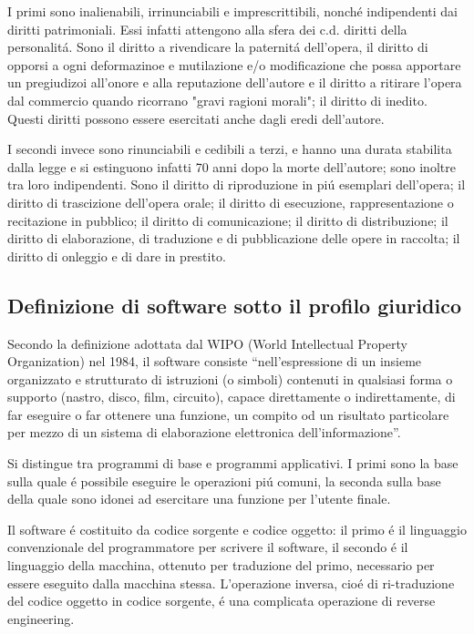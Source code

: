 \documentclass{article}
\begin{document}
I primi sono inalienabili, irrinunciabili e imprescrittibili, nonch\'e indipendenti dai diritti patrimoniali. Essi infatti attengono alla sfera dei c.d. diritti della personalit\'a. Sono il diritto a rivendicare la paternit\'a dell'opera, il diritto di opporsi a ogni deformazinoe e mutilazione e/o modificazione che possa apportare un pregiudizoi all'onore e alla reputazione dell'autore e il diritto a ritirare l'opera dal commercio quando ricorrano "gravi ragioni morali"; il diritto di inedito. Questi diritti possono essere esercitati anche dagli eredi dell'autore.

I secondi invece sono rinunciabili e cedibili a terzi, e hanno una durata stabilita dalla legge e si estinguono infatti 70 anni dopo la morte dell'autore; sono inoltre tra loro indipendenti. Sono il diritto di riproduzione in pi\'u esemplari dell'opera; il diritto di trascizione dell'opera orale; il diritto di esecuzione, rappresentazione o recitazione in pubblico; il diritto di comunicazione; il diritto di distribuzione; il diritto di elaborazione, di traduzione e di pubblicazione delle opere in raccolta; il diritto di onleggio e di dare in prestito.

\subsection{Definizione di software sotto il profilo giuridico}
Secondo la definizione adottata dal WIPO (World Intellectual Property Organization) nel 1984, il software consiste “nell’espressione di un insieme organizzato e strutturato di istruzioni (o simboli) contenuti in qualsiasi forma o supporto (nastro, disco, film, circuito), capace direttamente o indirettamente, di far eseguire o far ottenere una funzione, un compito od un risultato particolare per mezzo di un sistema di elaborazione elettronica dell’informazione”.

Si distingue tra programmi di base e programmi applicativi. I primi sono la base sulla quale \'e possibile eseguire le operazioni pi\'u comuni, la seconda sulla base della quale sono idonei ad esercitare una funzione per l'utente finale.

Il software \'e costituito da codice sorgente e codice oggetto: il primo \'e il linguaggio convenzionale del programmatore per scrivere il software, il secondo \'e il linguaggio della macchina, ottenuto per traduzione del primo, necessario per essere eseguito dalla macchina stessa. L'operazione inversa, cio\'e di ri-traduzione del codice oggetto in codice sorgente, \'e una complicata operazione di reverse engineering. 
\end{document}
